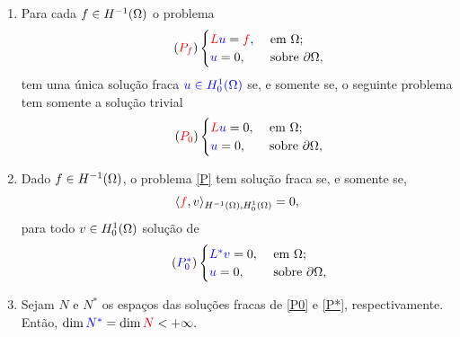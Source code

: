 \begin{frame}{}
\begin{teo}
\begin{enumerate}[a]
\item Para cada {\color{red}\(f\in H^{-1}(\Omega)\)} o problema
\begin{equation}\tag{{\color{red}\(P_f\)}}\label{P}  \lnum
\begin{cases}
{\color{red}L}{\color{blue}u}={\color{red}f}, & \text{ em } \Omega;\\
{\color{blue}u}=0, & \text{ sobre } \partial \Omega,
\end{cases}
\end{equation}
tem uma {\color{red}única solução fraca} \({\color{blue}u\in H_0^1(\Omega)}\) se, e somente se, o seguinte problema tem somente a solução trivial
\begin{equation}\tag{{\color{red}\(P_0\)}}\label{P0}  \lnum
\begin{cases}
{\color{red}L}{\color{blue}u}=0, & \text{ em } \Omega;\\
{\color{blue}u}=0, & \text{ sobre } \partial \Omega,
\end{cases}
\end{equation}
\end{enumerate}
\end{teo}
\end{frame}
\begin{frame}{}
\begin{block}{}
 
\begin{enumerate}[a]
\setcounter{enumi}{1}
\item Dado {\color{red}\(f\in H^{-1}(\Omega)\)}, o problema \eqref{P} tem solução fraca se, e somente se,
\[\langle{\color{red}f},v\rangle_{H^{-1}(\Omega),H_0^1(\Omega)}=0,\]
para todo \(v\in H_0^1(\Omega)\) solução de 
\begin{equation}\tag{{\color{blue}\(P^\ast_0\)}}\label{P*} \lnum 
\begin{cases}
{\color{blue}L^\ast}{\color{blue}v}=0, & \text{ em } \Omega;\\
{\color{blue}u}=0, & \text{ sobre } \partial \Omega,
\end{cases}
\end{equation}
\item Sejam {\color{red}\(N\)} e {\color{blue}\(N^\ast\)} os espaços das soluções fracas de \eqref{P0} e \eqref{P*}, respectivamente. Então,  \(\dim {\color{blue}N^\ast}=\dim{\color{red} N}<+\infty.\)
\end{enumerate}
\end{block}
\end{frame}
